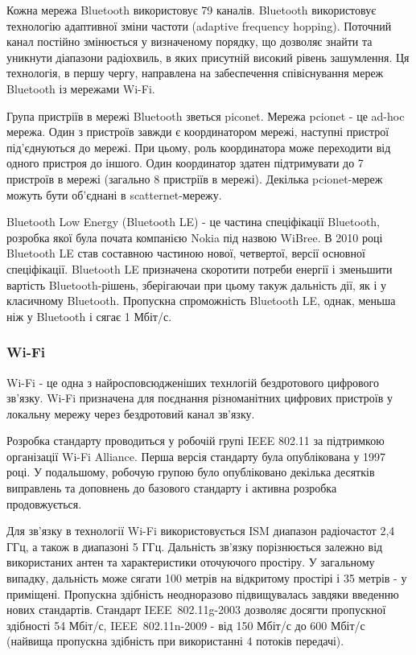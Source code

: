 \documentclass[a4paper,ukrainian,utf8,nocolumnsxix,floatsection,equationsection]{eskdtext}
\renewcommand\paragraph{\subsubsection}
\begin{document}
Кожна мережа Bluetooth використовує 79 каналів. Bluetooth використовує технологію адаптивної зміни частоти (adaptive frequency hopping). Поточний канал постійно змінюється у визначеному порядку, що дозволяє знайти та уникнути діапазони радіохвиль, в яких присутній високий рівень зашумлення. Ця технологія, в першу чергу, направлена на забеспечення співіснування мереж Bluetooth із мережами Wi-Fi.

Група пристріїв в мережі Bluetooth зветься piconet. Мережа pcionet - це ad-hoc мережа. Один з пристроїв завжди є координатором мережі, наступні пристрої під’єднуються до мережі. При цьому, роль координатора може переходити від одного пристроя до іншого. Один координатор здатен підтримувати до 7 пристроїв в мережі (загально 8 пристріїв в мережі). Декілька pcionet-мереж можуть бути об’єднані в scatternet-мережу.

Bluetooth Low Energy (Bluetooth LE) - це частина спеціфікації Bluetooth, розробка якої була почата  компанією Nokia під назвою WiBree. В 2010 році Bluetooth LE став составною частиною нової, четвертої, версії основної спеціфікації. Bluetooth LE призначена скоротити потреби енергії і зменьшити вартість Bluetooth-рішень, зберігаючаи при цьому такуж дальність дії, як і у класичному Bluetooth. Пропускна спроможність Bluetooth LE, однак, меньша ніж у Bluetooth і сягає 1 Мбіт/с.


\paragraph{Wi-Fi} %
\label{par:wi_fi}

Wi-Fi - це одна з найросповсюдженіших технлогій бездротового цифрового зв’язку. Wi-Fi призначена для поєднання різноманітних цифрових пристроїв у локальну мережу через бездротовий канал зв’язку. 

Розробка стандарту проводиться у робочій групі IEEE 802.11 за підтримкою організації Wi-Fi Alliance. Перша версія стандарту була опублікована у 1997 році. У подальшому, робочую групою було опубліковано декілька десятків виправлень та доповнень до базового стандарту і активна розробка продовжується.

Для зв’язку в технології Wi-Fi використовується ISM диапазон радіочастот 2,4 ГГц, а також в диапазоні 5 ГГц. Дальність зв’язку порізнюється залежно від використаних антен та характеристики оточуючого простіру. У загальному випадку, дальність може сягати 100 метрів на відкритому простірі і 35 метрів - у приміщені. Пропускна здібність неодноразово підвищувалась завдяки введенню нових стандартів. Стандарт IEEE~802.11g-2003 дозволяє досягти пропускної здібності 54 Мбіт/с, IEEE~802.11n-2009 - від 150 Мбіт/с до 600 Мбіт/с (найвища пропускна здібність при використанні 4 потоків передачі). 
\end{document}
